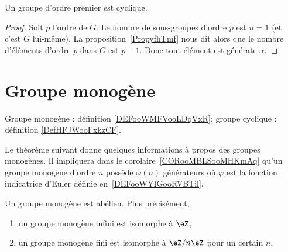 \begin{corollary}
	Un groupe d'ordre premier est cyclique.
\end{corollary}

\begin{proof}
	Soit \( p\) l'ordre de \( G\). Le nombre de sous-groupes d'ordre \( p\) est \( n=1\) (et c'est \( G\) lui-même). La proposition~\ref{PropyfhTmf} nous dit alors que le nombre d'éléments d'ordre \( p\) dans \( G\) est \( p-1\). Donc tout élément est générateur.
\end{proof}


\section{Groupe monogène}
\label{SECooXIHPooWVSjhT}


Groupe monogène : définition \ref{DEFooWMFVooLDqVxR}; groupe cyclique : définition \ref{DefHFJWooFxkzCF}.

Le théorème suivant donne quelques informations à propos des groupes monogènes. Il impliquera dans le corolaire~\ref{CORooMBLSooMHKmAq} qu'un groupe monogène d'ordre \( n\) possède \( \varphi(n)\) générateurs où \( \varphi\) est la fonction indicatrice d'Euler définie en~\ref{DEFooWYIGooRVBTil}.

\begin{theorem}     \label{THOooDOMZooOEYHAe}
	Un groupe monogène est abélien. Plus précisément,
	\begin{enumerate}
		\item
		      un groupe monogène infini est isomorphe à \( \eZ\),
		\item
		      un groupe monogène fini est isomorphe à \( \eZ/n\eZ\) pour un certain \( n\).
	\end{enumerate}
\end{theorem}

